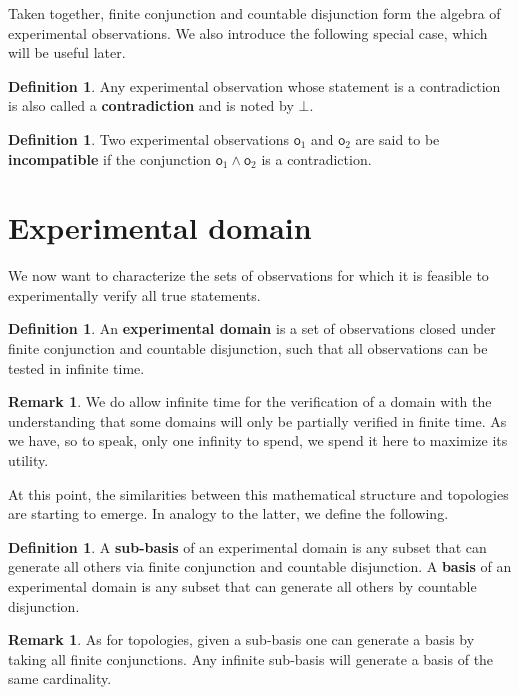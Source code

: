 \documentclass{amsart}
\theoremstyle{definition}
\newtheorem{defn}[thm]{Definition}
\newtheorem{rem}[thm]{Remark}
\numberwithin{equation}{section}
\begin{document}
Taken together, finite conjunction and countable disjunction form the algebra of experimental observations. We also introduce the following special case, which will be useful later.

\begin{defn}
Any experimental observation whose statement is a contradiction is also called a \textbf{contradiction} and is noted by $\bot$.
\end{defn}

\begin{defn}
Two experimental observations $\mathsf{o}_1$ and $\mathsf{o}_2$ are said to be \textbf{incompatible} if the conjunction $\mathsf{o}_1\wedge\mathsf{o}_2$ is a contradiction.
\end{defn}


\section{\bf Experimental domain}

We now want to characterize the sets of observations for which it is feasible to experimentally verify all true statements.

\begin{defn}
	An \textbf{experimental domain} is a set of observations closed under finite conjunction and countable disjunction, such that all observations can be tested in infinite time. 
\end{defn}

\begin{rem}
	We do allow infinite time for the verification of a domain with the understanding that some domains will only be partially verified in finite time. As we have, so to speak, only one infinity to spend, we spend it here to maximize its utility.
\end{rem}

At this point, the similarities between this mathematical structure and topologies are starting to emerge. In analogy to the latter, we define the following.

\begin{defn}
	A \textbf{sub-basis} of an experimental domain is any subset that can generate all others via finite conjunction and countable disjunction. A \textbf{basis} of an experimental domain is any subset that can generate all others by countable disjunction.
\end{defn}

\begin{rem}
	As for topologies, given a sub-basis one can generate a basis by taking all finite conjunctions. Any infinite sub-basis will generate a basis of the same cardinality.
\end{rem}
\end{document}
